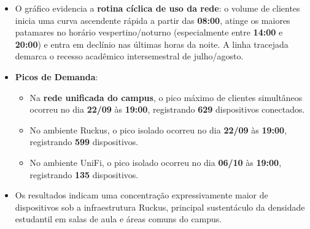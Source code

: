 \begin{itemize}
  \item O gráfico evidencia a \textbf{rotina cíclica de uso da rede}: o volume de clientes inicia uma curva ascendente rápida a partir das \textbf{08:00}, atinge os maiores patamares no horário vespertino/noturno (especialmente entre \textbf{14:00} e \textbf{20:00}) e entra em declínio nas últimas horas da noite. A linha tracejada demarca o recesso acadêmico intersemestral de julho/agosto.
  \item \textbf{Picos de Demanda}:
  \begin{itemize}
    \item Na \textbf{rede unificada do campus}, o pico máximo de clientes simultâneos ocorreu no dia \textbf{22/09} às \textbf{19:00}, registrando \textbf{629} dispositivos conectados.
    \item No ambiente Ruckus, o pico isolado ocorreu no dia \textbf{22/09} às \textbf{19:00}, registrando \textbf{599} dispositivos.
    \item No ambiente UniFi, o pico isolado ocorreu no dia \textbf{06/10} às \textbf{19:00}, registrando \textbf{135} dispositivos.
\end{itemize}
  \item Os resultados indicam uma concentração expressivamente maior de dispositivos sob a infraestrutura Ruckus, principal sustentáculo da densidade estudantil em salas de aula e áreas comuns do campus.


\end{itemize}